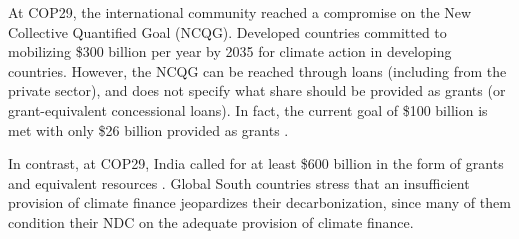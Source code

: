 \documentclass[12pt,english]{article}
\begin{document}
At COP29, the international community reached a compromise on the New Collective Quantified Goal (NCQG). Developed countries committed to mobilizing \$300 billion per year by 2035 for climate action in developing countries. 
However, 
the NCQG %
can be reached through loans (including from the private sector), and does not specify what share should be provided as grants (or grant-equivalent concessional loans). In fact, the current goal of \$100 billion is met with only \$26 billion provided as grants \citep{oecd_climate_2024}. 

In contrast, at COP29, 
India called for at least \$600 billion in the form of grants and equivalent resources 
\citep{earth_negotiations_bulletin_daily_2024}. 
Global South countries stress that an insufficient provision of climate finance jeopardizes their decarbonization, since many of them condition their NDC on the adequate provision of climate finance. %
\end{document}
